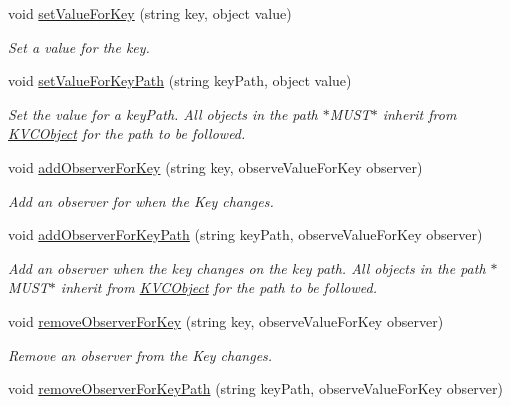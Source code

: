 \begin{DoxyCompactItemize}
void \hyperlink{classorg_1_1zensoftware_1_1_k_v_c_object_a98df6d75d84c6f1bde8e628971ac0ee6}{setValueForKey} (string key, object value)
\begin{DoxyCompactList}\small\item\em Set a value for the key. \item\end{DoxyCompactList}\item 
void \hyperlink{classorg_1_1zensoftware_1_1_k_v_c_object_a73079f0d9176bd7660117b5bd90627dd}{setValueForKeyPath} (string keyPath, object value)
\begin{DoxyCompactList}\small\item\em Set the value for a keyPath. All objects in the path $\ast$MUST$\ast$ inherit from \hyperlink{classorg_1_1zensoftware_1_1_k_v_c_object}{KVCObject} for the path to be followed. \item\end{DoxyCompactList}\item 
void \hyperlink{classorg_1_1zensoftware_1_1_k_v_c_object_ac2e48f92639d9dae571593b9e257ee35}{addObserverForKey} (string key, observeValueForKey observer)
\begin{DoxyCompactList}\small\item\em Add an observer for when the Key changes. \item\end{DoxyCompactList}\item 
void \hyperlink{classorg_1_1zensoftware_1_1_k_v_c_object_acb8012bb3496be1e346873d0900fdc1b}{addObserverForKeyPath} (string keyPath, observeValueForKey observer)
\begin{DoxyCompactList}\small\item\em Add an observer when the key changes on the key path. All objects in the path $\ast$MUST$\ast$ inherit from \hyperlink{classorg_1_1zensoftware_1_1_k_v_c_object}{KVCObject} for the path to be followed. \item\end{DoxyCompactList}\item 
void \hyperlink{classorg_1_1zensoftware_1_1_k_v_c_object_abd9f01045119fff74ce9de7a3f31c104}{removeObserverForKey} (string key, observeValueForKey observer)
\begin{DoxyCompactList}\small\item\em Remove an observer from the Key changes. \item\end{DoxyCompactList}\item 
void \hyperlink{classorg_1_1zensoftware_1_1_k_v_c_object_acd234b0a0f3327436fe5a98112f2b37f}{removeObserverForKeyPath} (string keyPath, observeValueForKey observer)

\end{DoxyCompactItemize}
